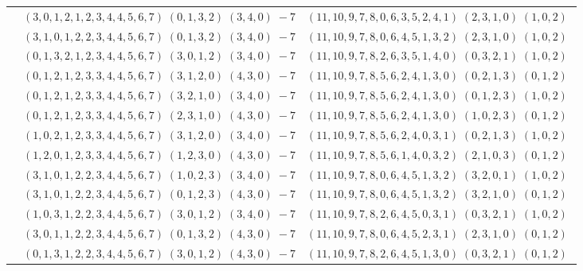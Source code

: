 \documentclass[11pt]{article}
\begin{document}
\begin{longtable}[l]{|c|c|c|}
 \cline{2-3} 
 & $(3 ,0 ,1 ,2 ,1 ,2 ,3 ,4 ,4 ,5 ,6 ,7) \;(0 ,1 ,3 ,2) \;(3 ,4 ,0) \;-7$ & $(11 ,10 ,9 ,7 ,8 ,0 ,6 ,3 ,5 ,2 ,4 ,1) \;(2 ,3 ,1 ,0) \;(1 ,0 ,2) \;$\\ 
 \cline{2-3} 
 & $(3 ,1 ,0 ,1 ,2 ,2 ,3 ,4 ,4 ,5 ,6 ,7) \;(0 ,1 ,3 ,2) \;(3 ,4 ,0) \;-7$ & $(11 ,10 ,9 ,7 ,8 ,0 ,6 ,4 ,5 ,1 ,3 ,2) \;(2 ,3 ,1 ,0) \;(1 ,0 ,2) \;$\\ 
 \cline{2-3} 
 & $(0 ,1 ,3 ,2 ,1 ,2 ,3 ,4 ,4 ,5 ,6 ,7) \;(3 ,0 ,1 ,2) \;(3 ,4 ,0) \;-7$ & $(11 ,10 ,9 ,7 ,8 ,2 ,6 ,3 ,5 ,1 ,4 ,0) \;(0 ,3 ,2 ,1) \;(1 ,0 ,2) \;$\\ 
 \cline{2-3} 
 & $(0 ,1 ,2 ,1 ,2 ,3 ,3 ,4 ,4 ,5 ,6 ,7) \;(3 ,1 ,2 ,0) \;(4 ,3 ,0) \;-7$ & $(11 ,10 ,9 ,7 ,8 ,5 ,6 ,2 ,4 ,1 ,3 ,0) \;(0 ,2 ,1 ,3) \;(0 ,1 ,2) \;$\\ 
 \cline{2-3} 
 & $(0 ,1 ,2 ,1 ,2 ,3 ,3 ,4 ,4 ,5 ,6 ,7) \;(3 ,2 ,1 ,0) \;(3 ,4 ,0) \;-7$ & $(11 ,10 ,9 ,7 ,8 ,5 ,6 ,2 ,4 ,1 ,3 ,0) \;(0 ,1 ,2 ,3) \;(1 ,0 ,2) \;$\\ 
 \cline{2-3} 
 & $(0 ,1 ,2 ,1 ,2 ,3 ,3 ,4 ,4 ,5 ,6 ,7) \;(2 ,3 ,1 ,0) \;(4 ,3 ,0) \;-7$ & $(11 ,10 ,9 ,7 ,8 ,5 ,6 ,2 ,4 ,1 ,3 ,0) \;(1 ,0 ,2 ,3) \;(0 ,1 ,2) \;$\\ 
 \cline{2-3} 
 & $(1 ,0 ,2 ,1 ,2 ,3 ,3 ,4 ,4 ,5 ,6 ,7) \;(3 ,1 ,2 ,0) \;(3 ,4 ,0) \;-7$ & $(11 ,10 ,9 ,7 ,8 ,5 ,6 ,2 ,4 ,0 ,3 ,1) \;(0 ,2 ,1 ,3) \;(1 ,0 ,2) \;$\\ 
 \cline{2-3} 
 & $(1 ,2 ,0 ,1 ,2 ,3 ,3 ,4 ,4 ,5 ,6 ,7) \;(1 ,2 ,3 ,0) \;(4 ,3 ,0) \;-7$ & $(11 ,10 ,9 ,7 ,8 ,5 ,6 ,1 ,4 ,0 ,3 ,2) \;(2 ,1 ,0 ,3) \;(0 ,1 ,2) \;$\\ 
 \cline{2-3} 
 & $(3 ,1 ,0 ,1 ,2 ,2 ,3 ,4 ,4 ,5 ,6 ,7) \;(1 ,0 ,2 ,3) \;(3 ,4 ,0) \;-7$ & $(11 ,10 ,9 ,7 ,8 ,0 ,6 ,4 ,5 ,1 ,3 ,2) \;(3 ,2 ,0 ,1) \;(1 ,0 ,2) \;$\\ 
 \cline{2-3} 
 & $(3 ,1 ,0 ,1 ,2 ,2 ,3 ,4 ,4 ,5 ,6 ,7) \;(0 ,1 ,2 ,3) \;(4 ,3 ,0) \;-7$ & $(11 ,10 ,9 ,7 ,8 ,0 ,6 ,4 ,5 ,1 ,3 ,2) \;(3 ,2 ,1 ,0) \;(0 ,1 ,2) \;$\\ 
 \cline{2-3} 
 & $(1 ,0 ,3 ,1 ,2 ,2 ,3 ,4 ,4 ,5 ,6 ,7) \;(3 ,0 ,1 ,2) \;(3 ,4 ,0) \;-7$ & $(11 ,10 ,9 ,7 ,8 ,2 ,6 ,4 ,5 ,0 ,3 ,1) \;(0 ,3 ,2 ,1) \;(1 ,0 ,2) \;$\\ 
 \cline{2-3} 
 & $(3 ,0 ,1 ,1 ,2 ,2 ,3 ,4 ,4 ,5 ,6 ,7) \;(0 ,1 ,3 ,2) \;(4 ,3 ,0) \;-7$ & $(11 ,10 ,9 ,7 ,8 ,0 ,6 ,4 ,5 ,2 ,3 ,1) \;(2 ,3 ,1 ,0) \;(0 ,1 ,2) \;$\\ 
 \cline{2-3} 
 & $(0 ,1 ,3 ,1 ,2 ,2 ,3 ,4 ,4 ,5 ,6 ,7) \;(3 ,0 ,1 ,2) \;(4 ,3 ,0) \;-7$ & $(11 ,10 ,9 ,7 ,8 ,2 ,6 ,4 ,5 ,1 ,3 ,0) \;(0 ,3 ,2 ,1) \;(0 ,1 ,2) \;$\\ 

\end{longtable}
\end{document}

